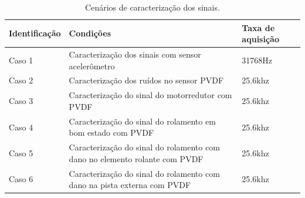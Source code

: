 \documentclass[
	12pt,				
	oneside,			
	a4paper,			
	english,			
	brazil,			
	]{abntex2ppgsi}
\begin{document}
\begin{table}[h]
\caption{Cenários de caracterização dos sinais.}
\begin{tabularx}{\textwidth}{|X|X|X|}
\hline
Identificação & Condições~                                                                                                                          & Taxa de aquisição  \\ 
\hline
Caso
1        & Caracterização dos sinais com sensor acelerômetro                                                                                                              & 31768Hz            \\ 
\hline
Caso 2        & Caracterização dos ruídos no sensor PVDF & 25.6khz            \\ 
\hline
Caso 3        & Caracterização do sinal do motorredutor com PVDF & 25.6khz            \\ 
\hline
Caso 4        & Caracterização do sinal do rolamento em bom estado com PVDF                                                                                              & 25.6khz            \\ 
\hline
Caso 5        & Caracterização do sinal do rolamento com dano no elemento rolante com PVDF                                                                               & 25.6khz            \\ 
\hline
Caso 6        & Caracterização do sinal do rolamento com dano na pista externa com PVDF                                                                               & 25.6khz            \\ 
\hline
\end{tabularx}
\label{tab:conjuntoDeTestes}
\end{table}
\end{document}
